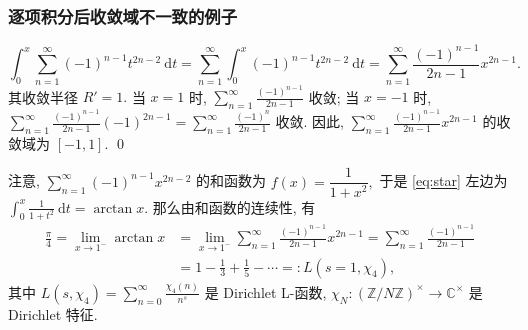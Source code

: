 
\begin{frame}
\frametitle{逐项积分后收敛域不一致的例子}

\begin{equation}
\int_{0}^{x} \sum_{n=1}^{\infty} (-1)^{n-1} t^{2n-2} ~ \mathrm{d}t = \sum_{n=1}^{\infty} \int_{0}^{x} (-1)^{n-1} t^{2n-2} ~ \mathrm{d}t = \sum_{n=1}^{\infty} \frac{(-1)^{n-1}}{2n-1} x^{2n-1}.
\tag{$\star$}
\label{eq:star}
\end{equation}
其收敛半径 $R' = 1.$ 当 $x = 1$ 时, $\displaystyle \sum_{n=1}^{\infty} \frac{(-1)^{n-1}}{2n-1}$ 收敛; 当 $x = -1$ 时, $\displaystyle \sum_{n=1}^{\infty} \frac{(-1)^{n-1}}{2n-1} (-1)^{2n-1} = \displaystyle \sum_{n=1}^{\infty} \frac{(-1)^{n}}{2n-1}$ 收敛. 因此, $\displaystyle \sum_{n=1}^{\infty} \frac{(-1)^{n-1}}{2n-1} x^{2n-1}$ 的收敛域为 $[-1, 1].$
\qed

\pause
\vspace{0.5em}

注意, $\displaystyle \sum_{n=1}^{\infty} (-1)^{n-1} x^{2n-2}$ 的和函数为 $f(x) = \dfrac{1}{1+x^2},$ 于是 \eqref{eq:star} 左边为 $\displaystyle \int_{0}^{x} \frac{1}{1+t^2} ~ \mathrm{d}t = \arctan x.$ 那么由和函数的连续性, 有
\begin{align*}
\frac{\pi}{4} = \lim_{x \to 1^-} \arctan x & = \lim_{x \to 1^-} \sum_{n=1}^{\infty} \frac{(-1)^{n-1}}{2n-1} x^{2n-1} = \sum_{n=1}^{\infty} \frac{(-1)^{n-1}}{2n-1} \\
& = 1 - \frac{1}{3} + \frac{1}{5} - \cdots =: L(s=1, \chi_4),
\end{align*}
其中 $L(s, \chi_4) = \sum_{n=0}^{\infty} \frac{\chi_4(n)}{n^s}$ 是 Dirichlet L-函数, $\chi_N: \left( \mathbb{Z} / N\mathbb{Z} \right)^\times \to \mathbb{C}^\times$ 是 Dirichlet 特征.

\end{frame}


